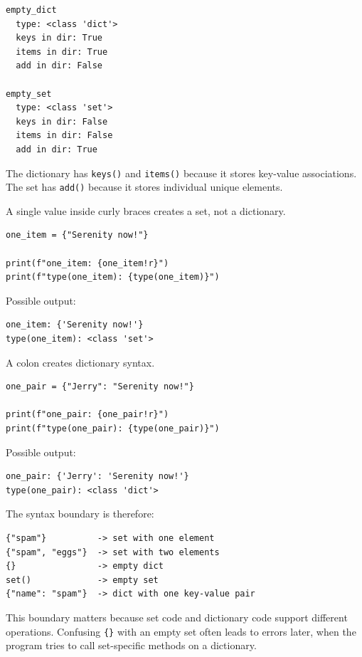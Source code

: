 \begin{verbatim}
empty_dict
  type: <class 'dict'>
  keys in dir: True
  items in dir: True
  add in dir: False

empty_set
  type: <class 'set'>
  keys in dir: False
  items in dir: False
  add in dir: True
\end{verbatim}

The dictionary has \texttt{keys()} and \texttt{items()} because it stores key-value associations. The set has \texttt{add()} because it stores individual unique elements.

A single value inside curly braces creates a set, not a dictionary.

\begin{verbatim}
one_item = {"Serenity now!"}

print(f"one_item: {one_item!r}")
print(f"type(one_item): {type(one_item)}")
\end{verbatim}

Possible output:

\begin{verbatim}
one_item: {'Serenity now!'}
type(one_item): <class 'set'>
\end{verbatim}

A colon creates dictionary syntax.

\begin{verbatim}
one_pair = {"Jerry": "Serenity now!"}

print(f"one_pair: {one_pair!r}")
print(f"type(one_pair): {type(one_pair)}")
\end{verbatim}

Possible output:

\begin{verbatim}
one_pair: {'Jerry': 'Serenity now!'}
type(one_pair): <class 'dict'>
\end{verbatim}

The syntax boundary is therefore:

\begin{verbatim}
{"spam"}          -> set with one element
{"spam", "eggs"}  -> set with two elements
{}                -> empty dict
set()             -> empty set
{"name": "spam"}  -> dict with one key-value pair
\end{verbatim}

This boundary matters because set code and dictionary code support different operations. Confusing \texttt{\{\}} with an empty set often leads to errors later, when the program tries to call set-specific methods on a dictionary.


